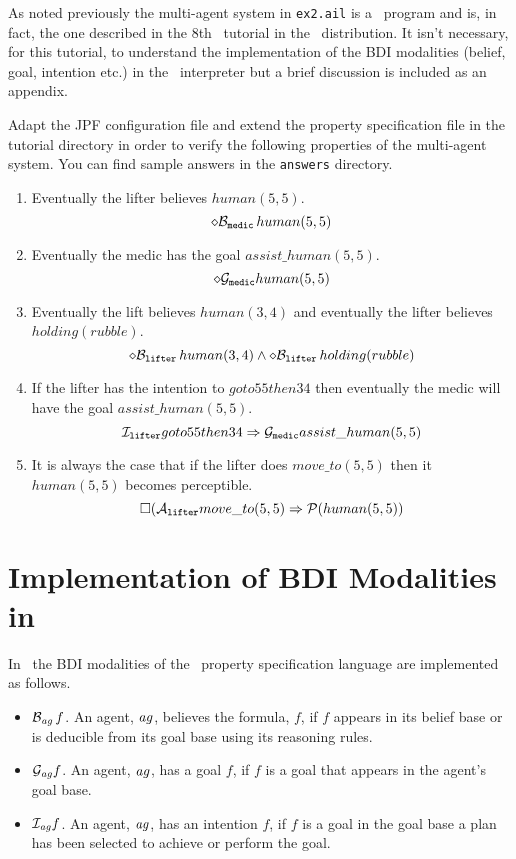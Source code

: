 \documentclass[a4]{article}
\begin{document}
As noted previously the multi-agent system in \texttt{ex2.ail} is a \gwendolen\ program and is, in fact, the one described in the 8th \gwendolen\ tutorial in the \mcapl\ distribution.  It isn't necessary, for this tutorial, to understand the implementation of the BDI modalities (belief, goal, intention etc.) in the \gwendolen\ interpreter but a brief discussion is included as an appendix.

Adapt the JPF configuration file and extend the property specification file in the tutorial directory in order to verify the following properties of the multi-agent system.  You can find sample answers in the \texttt{answers} directory.

\begin{enumerate}
\item Eventually the lifter believes $human(5, 5)$.
$$\diamond \mathrm{{\cal B}}_{\texttt{medic}} \, human(5, 5)$$
\item Eventually the medic has the goal $assist\_human(5, 5)$.
$$\diamond \mathrm{{\cal G}}_{\texttt{medic}} human(5, 5)$$
\item Eventually the lift believes $human(3, 4)$ and eventually the lifter believes $holding(rubble)$.
$$\diamond \mathrm{{\cal B}}_{\texttt{lifter}} \, human(3, 4) \wedge \diamond \mathrm{{\cal B}}_{\texttt{lifter}} \, holding(rubble)$$
\item If the lifter has the intention to $goto55then34$ then eventually the medic will have the goal $assist\_human(5, 5)$. 
$$\mathrm{{\cal I}}_{\texttt{lifter}} goto55then34 \Rightarrow \mathrm{{\cal G}}_{\texttt{medic}} assist\_human(5, 5)$$
\item It is always the case that if the lifter does $move\_to(5, 5)$ then it $human(5, 5)$ becomes perceptible.  
$$\Box (\mathrm{{\cal A}}_{\texttt{lifter}} move\_to(5, 5) \Rightarrow \mathrm{{\cal P}}(human(5, 5))$$
\end{enumerate}



\appendix
\section{Implementation of BDI Modalities in \gwendolen}
\label{s:impl_bdi}

In \gwendolen\ the BDI modalities of the \ajpf\ property specification language are implemented as follows.

\begin{itemize}
\item $\mathrm{{\cal B}}_{\mathit{ag}} \, f$.  An agent, $\mathit{ag}$, believes the formula, $f$, if $f$ appears in its belief base or is deducible from its goal base using its reasoning rules.
\item $\mathrm{{\cal G}}_{\mathit{ag}} f$.  An agent, $\mathit{ag}$, has a goal $f$, if $f$ is a goal that appears in the agent's goal base.
\item $\mathrm{{\cal I}}_{\mathit{ag}} f$.  An agent, $\mathit{ag}$, has an intention $f$, if $f$ is a goal in the goal base a plan has been selected to achieve or perform the goal.
\end{itemize}
\end{document}
